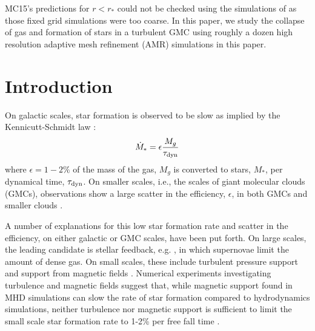 \documentclass[../dissertation.tex]{subfiles}
\begin{document}
MC15's predictions for $r<r_*$ could not be checked using the simulations
of \citet{2015ApJ...800...49L} as those fixed grid simulations were
too coarse.  In this paper, we study the collapse of gas and formation
of stars in a turbulent GMC using roughly a dozen high resolution
adaptive mesh refinement (AMR) simulations in this paper.




\section{Introduction}

On galactic scales, star formation is observed to be slow as implied by the Kennicutt-Schmidt law \citep{1998ApJ...498..541K,2008AJ....136.2782L}:
\begin{equation}\label{eq:jet_kennicutt}
 \dot{M}_* = \epsilon \frac{M_g}{\tau_{\rm dyn}}
\end{equation}
where $\epsilon = 1-2\%$ of the mass of the gas, $M_g$ is converted to stars, $M_*$, per dynamical time, $\tau_{\rm dyn}$. On smaller scales, i.e., the scales of giant molecular clouds (GMCs), observations show a large scatter in the efficiency, $\epsilon$, in both GMCs \citep{2016ApJ...833..229L} and smaller clouds \citep{2014ApJ...782..114E}. %

A number of explanations for this low star formation rate and scatter in the efficiency, on either galactic or GMC scales, have been put forth.
On large scales, the leading candidate is stellar feedback, e.g. \citet{1986ApJ...303...39D}, in which supernovae limit the amount of dense gas. %
On small scales, these include turbulent pressure support \citep{1992ApJ...396..631M} and support from magnetic fields \citep{1966MNRAS.132..359S,1976ApJ...207..141M}. %
Numerical experiments investigating turbulence and magnetic fields suggest that, while magnetic support found in MHD simulations can slow the rate of star formation compared to hydrodynamics simulations, neither turbulence nor magnetic support is sufficient to limit the small scale star formation rate to 1-2\% per free fall time
\citep{2010ApJ...709...27W,2011MNRAS.410L...8C,2011ApJ...730...40P,2012ApJ...754...71K,2014MNRAS.439.3420M,2015ApJ...808...48B,2017ApJ...838...40M}.
\end{document}

